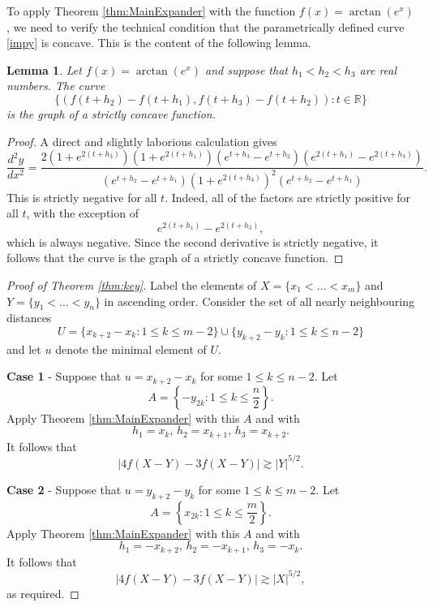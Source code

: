\documentclass[11pt,oneside]{amsart}
\numberwithin{exercise}{subsection}
\newtheorem{lemma}{Lemma}
\begin{document}
To apply Theorem \ref{thm:MainExpander} with the function $f(x)= \arctan(e^x)$, we need to verify the technical condition that the parametrically defined curve \eqref{impy} is concave. This is the content of the following lemma.

\begin{lemma}
Let $f(x)=\arctan(e^x)$ and suppose that $h_1<h_2<h_3$ are real numbers. The curve
\[
 \{(f(t+h_2)-f(t+h_1),f(t+h_3)-f(t+h_2)) : t\in \mathbb R\}
 \]
 is the graph of a strictly concave function.
\end{lemma}

\begin{proof}
A direct and slightly laborious calculation gives
\[
 \frac{d^2y}{dx^2}=\frac{2(1+e^{2(t+h_3)})(1+e^{2(t+h_1)})(e^{t+h_3}-e^{t+h_2})(e^{2(t+h_1)}-e^{2(t+h_3)})}{(e^{t+h_2}-e^{t+h_1})(1+e^{2(t+h_3)})^2(e^{t+h_2}-e^{t+h_1})}.
 \]
 This is strictly negative for all $t$. Indeed, all of the factors are strictly positive for all $t$, with the exception of
 \[
 e^{2(t+h_1)}-e^{2(t+h_3)},
 \]
 which is always negative. Since the second derivative is strictly negative, it follows that the curve is the graph of a strictly concave function.

\end{proof}


\begin{proof}[Proof of Theorem \ref{thm:key}]







Label the elements of $X=\{x_1 < \dots < x_m \}$ and $Y=\{y_1 < \dots < y_n \}$ in ascending order. Consider the set of all nearly neighbouring distances
\[
U=\{x_{k+2} - x_k:  1 \leq k \leq m-2 \} \cup \{y_{k+2} - y_k:  1 \leq k \leq n-2 \}
\]
and let $u$ denote the minimal element of $U$. 

\textbf{Case 1} - Suppose that $u=x_{k+2} - x_k$ for some $1 \leq k \leq n-2$.  
Let 
\[
A=\left \{ -y_{2k} : 1 \leq k \leq \frac{n}{2} \right \}.
\]
Apply Theorem \ref{thm:MainExpander} with this $A$ and with
\[
h_1=x_k, \, h_2=x_{k+1}, \, h_3=x_{k+2}.
\]
It follows that
\[
|4f(X-Y)-3f(X-Y)| \gtrsim |Y|^{5/2}.
\]

\textbf{Case 2} - Suppose that $u=y_{k+2} - y_k$ for some $1 \leq k \leq m-2$.  
Let 
\[
A=\left \{ x_{2k} : 1 \leq k \leq \frac{m}{2} \right \}.
\]
Apply Theorem \ref{thm:MainExpander} with this $A$ and with
\[
h_1=-x_{k+2}, \, h_2=-x_{k+1}, \, h_3=-x_{k}.
\]
It follows that
\[
|4f(X-Y)-3f(X-Y)| \gtrsim |X|^{5/2},
\]
as required. \end{proof}
\end{document}
